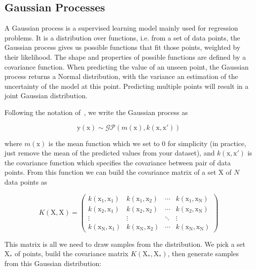\subsection{Gaussian Processes}
\label{ssec:gp}

A Gaussian process is a supervised learning model mainly used for regression problems. It is a distribution over functions, i.e. from a set of data points, the Gaussian process gives us possible functions that fit those points, weighted by their likelihood. The shape and properties of possible functions are defined by a covariance function. When predicting the value of an unseen point, the Gaussian process returns a Normal distribution, with the variance an estimation of the uncertainty of the model at this point. Predicting multiple points will result in a joint Gaussian distribution.

Following the notation of~\textcite{rasmussen2005}, we write the Gaussian process as

\begin{equation}
    \mathrm{y}(\mathrm{x}) \sim \mathcal{GP} \left( m(\mathrm{x}), k(\mathrm{x}, \mathrm{x'}) \right)
\end{equation}

where $m(\mathrm{x})$ is the mean function which we set to $0$ for simplicity (in practice, just remove the mean of the predicted values from your dataset), and $k(\mathrm{x}, \mathrm{x'})$ is the covariance function which specifies the covariance between pair of data points. From this function we can build the covariance matrix of a set $\mathrm{X}$ of $N$ data points as

\begin{equation}
    K(\mathrm{X}, \mathrm{X}) = 
    \begin{pmatrix}
    k(\mathrm{x_1}, \mathrm{x_1}) & k(\mathrm{x_1}, \mathrm{x_2}) & \cdots & k(\mathrm{x_1}, \mathrm{x_N}) \\
    k(\mathrm{x_2}, \mathrm{x_1}) & k(\mathrm{x_2}, \mathrm{x_2}) & \cdots & k(\mathrm{x_2}, \mathrm{x_N}) \\
    \vdots & \vdots & \ddots & \vdots \\
    k(\mathrm{x_N}, \mathrm{x_1}) & k(\mathrm{x_N}, \mathrm{x_2}) & \cdots & k(\mathrm{x_N}, \mathrm{x_N})
    \end{pmatrix}
\end{equation}

This matrix is all we need to draw samples from the distribution. We pick a set $\mathrm{X_*}$ of points, build the covariance matrix $K(\mathrm{X_*}, \mathrm{X_*})$, then generate samples from this Gaussian distribution:


